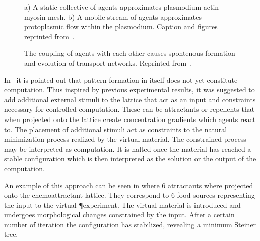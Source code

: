			\begin{figure}
				\centering
				
				\caption[Multi-agent \P - Collective behavior of agents]{a) A static collective of agents approximates plasmodium actin-myosin mesh. b) A mobile stream of agents approximates protoplasmic flow within the plasmodium. Caption and figures reprinted from~\cite{jones2010characteristics}.}
				\label{fig:agent_structures}
			\end{figure}

			\begin{figure}
				\centering
				
				
				\caption[Multi-agent \P - Evolution of agents]{The coupling of agents with each other causes spontenous formation and evolution of transport networks. Reprinted from~\cite{jones2016multi}.}
				\label{fig:agent_evolution}
			\end{figure}

			In~\cite{jones2016multi} it is pointed out that pattern formation in itself does not yet constitute computation. Thus inspired by previous experimental results, it was suggested to add additional external stimuli to the lattice that act as an input and constraints necessary for controlled computation. These can be attractants or repellents that when projected onto the lattice create concentration gradients which agents react to. The placement of additional stimuli act as constraints to the natural minimization process realized by the virtual material. The constrained process may be interpreted as computation. It is halted once the material has reached a stable configuration which is then interpreted as the solution or the output of the computation.

			An example of this approach can be seen in  where 6 attractants where projected onto the chemoattractant lattice. They correspond to 6 food sources representing the input to the virtual \P experiment. The virtual material is introduced and undergoes morphological changes constrained by the input. After a certain number of iteration the configuration has stabilized, revealing a minimum Steiner tree.

